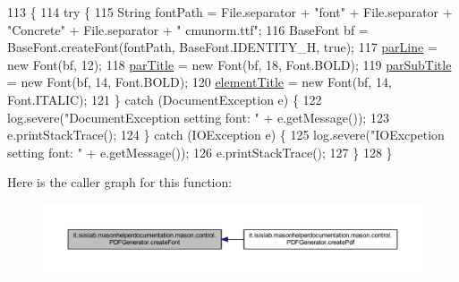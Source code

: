 \begin{DoxyCode}
113                               \{
114         \textcolor{keywordflow}{try} \{
115             String fontPath = File.separator + \textcolor{stringliteral}{"font"} + File.separator + \textcolor{stringliteral}{"Concrete"} + File.separator + \textcolor{stringliteral}{"
      cmunorm.ttf"};
116             BaseFont bf = BaseFont.createFont(fontPath, BaseFont.IDENTITY\_H, \textcolor{keyword}{true});
117             \hyperlink{classit_1_1isislab_1_1masonhelperdocumentation_1_1mason_1_1control_1_1_p_d_f_generator_a4887bc031c4ee6469cf807e7cd1afca6}{parLine} = \textcolor{keyword}{new} Font(bf, 12);
118             \hyperlink{classit_1_1isislab_1_1masonhelperdocumentation_1_1mason_1_1control_1_1_p_d_f_generator_a74f4e5e2095668aa762c3c3df4325c74}{parTitle} = \textcolor{keyword}{new} Font(bf, 18, Font.BOLD);
119             \hyperlink{classit_1_1isislab_1_1masonhelperdocumentation_1_1mason_1_1control_1_1_p_d_f_generator_ac4f2d6c81c14b60dcddfc358b9296ee5}{parSubTitle} = \textcolor{keyword}{new} Font(bf, 14, Font.BOLD);
120             \hyperlink{classit_1_1isislab_1_1masonhelperdocumentation_1_1mason_1_1control_1_1_p_d_f_generator_aef4e775d865ce931436933184abfcafa}{elementTitle} = \textcolor{keyword}{new} Font(bf, 14, Font.ITALIC);
121         \} \textcolor{keywordflow}{catch} (DocumentException e) \{
122             log.severe(\textcolor{stringliteral}{"DocumentException setting font: "} + e.getMessage());
123             e.printStackTrace();
124         \} \textcolor{keywordflow}{catch} (IOException e) \{
125             log.severe(\textcolor{stringliteral}{"IOExcpetion setting font: "} + e.getMessage());
126             e.printStackTrace();
127         \}
128     \}
\end{DoxyCode}


Here is the caller graph for this function\-:\nopagebreak
\begin{figure}[H]
\begin{center}
\leavevmode
\includegraphics[width=350pt]{classit_1_1isislab_1_1masonhelperdocumentation_1_1mason_1_1control_1_1_p_d_f_generator_a403097faddc3554447db07d62b3ebfda_icgraph}
\end{center}
\end{figure}


